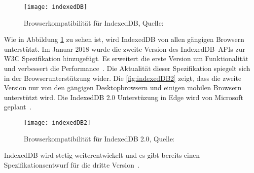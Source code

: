 \begin{figure}[H]
	\centering
	\texttt{[image: indexedDB]}
	\grayRule
	\caption[Browserkompatibilität für IndexedDB]{Browserkompatibilität für IndexedDB, Quelle: ~\cite{caniuse-idb}}
	\label{fig:indexedDB}
\end{figure}
Wie in Abbildung \ref{fig:indexedDB} zu sehen ist, wird IndexedDB von allen gängigen Browsern unterstützt. 
%
Im Januar 2018 wurde die zweite Version des IndexedDB--\glspl{API} zur W3C Spezifikation hinzugefügt. Es erweitert die erste Version um Funktionalität und verbessert die Performance~\cite{idb2}.
Die Aktualität dieser Spezifikation spiegelt sich in der Browserunterstützung wider. Die \autoref{fig:indexedDB2} zeigt, dass die zweite Version nur von den gängigen Desktopbrowsern und einigen mobilen Browsern unterstützt wird. Die IndexedDB 2.0 Unterstüzung in Edge wird von Microsoft geplant~\cite{edge}.
\begin{figure}[H]
	\centering
	\texttt{[image: indexedDB2]}
	\grayRule
	\caption[Browserkompatibilität für IndexedDB 2.0]{Browserkompatibilität für IndexedDB 2.0, Quelle: ~\cite{caniuse-idb}}
	\label{fig:indexedDB2}
\end{figure}
IndexedDB wird stetig weiterentwickelt und es gibt bereits einen Spezifikationsentwurf für die dritte Version~\cite{idb3}. 